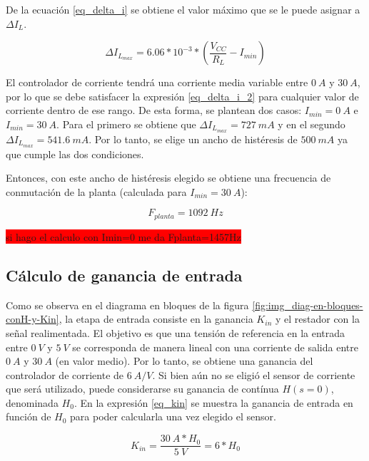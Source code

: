 De la ecuación \ref{eq_delta_i} se obtiene el valor máximo que se le puede asignar a $\Delta I_L$. 

\begin{equation} \label{eq_delta_i_2}
	\Delta I_{L_{max}}=6.06*10^{-3}*(\frac{V_{CC}}{R_L}-I_{min})
\end{equation}

El controlador de corriente tendrá una corriente media variable entre $0\:A$ y $30\:A$, por lo que se debe satisfacer la expresión \ref{eq_delta_i_2} para cualquier valor de corriente dentro de ese rango. De esta forma, se plantean dos casos: $I_{min}=0\:A$ e $I_{min}=30\:A$. Para el primero se obtiene que $\Delta I_{L_{max}}=727\:mA$ y en el segundo $\Delta I_{L_{max}}=541.6\:mA$. Por lo tanto, se elige un ancho de histéresis de $500\:mA$ ya que cumple las dos condiciones.

Entonces, con este ancho de histéresis elegido se obtiene una frecuencia de conmutación de la planta (calculada para $I_{min}=30\:A$):

\begin{equation} \label{eq_fplanta}
	F_{planta}=1092\:Hz
\end{equation}

\colorbox{red}{si hago el calculo con Imin=0 me da Fplanta=1457Hz}

\subsection{Cálculo de ganancia de entrada}

Como se observa en el diagrama en bloques de la figura \ref{fig:img_diag-en-bloques-conH-y-Kin}, la etapa de entrada consiste en la ganancia $K_{in}$ y el restador con la señal realimentada. El objetivo es que una tensión de referencia en la entrada entre $0\:V$ y $5\:V$ se corresponda de manera lineal con una corriente de salida entre $0\:A$ y $30\:A$ (en valor medio). Por lo tanto, se obtiene una ganancia del controlador de corriente de $6\:A/V$. Si bien aún no se eligió el sensor de corriente que será utilizado, puede considerarse su ganancia de contínua $H(s=0)$, denominada $H_0$. En la expresión \ref{eq_kin} se muestra la ganancia de entrada en función de $H_0$ para poder calcularla una vez elegido el sensor.

\begin{equation} \label{eq_kin}
	K_{in}=\frac{30\:A*H_0}{5\:V}=6*H_0 
\end{equation}

